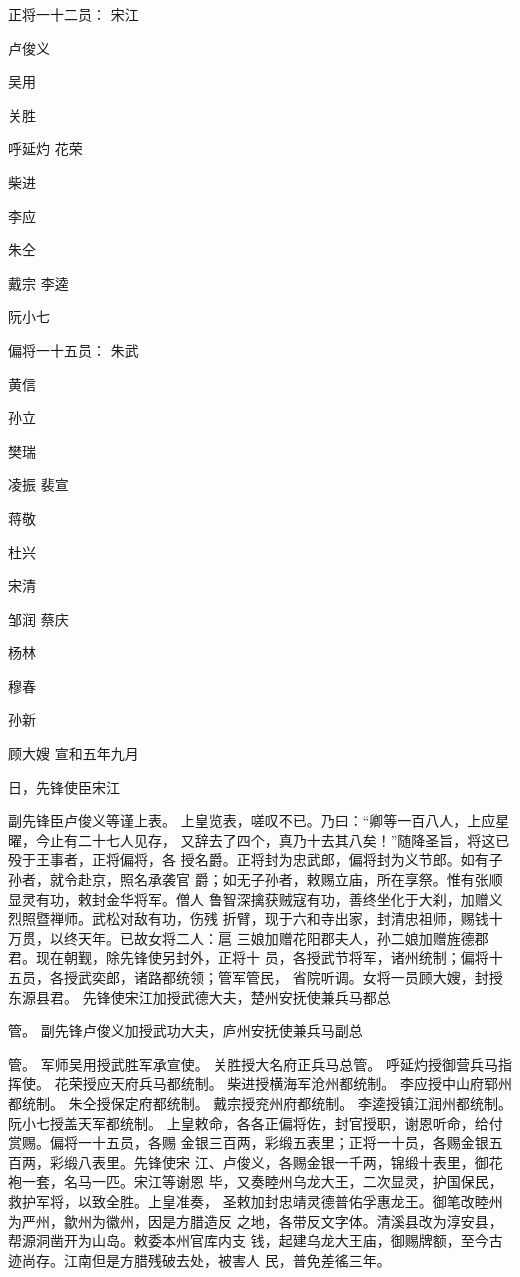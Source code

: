 正将一十二员：
宋江

卢俊义

吴用

关胜

呼延灼
花荣

柴进

李应

朱仝

戴宗
李逵

阮小七

偏将一十五员：
朱武

黄信

孙立

樊瑞

凌振
裴宣

蒋敬

杜兴

宋清

邹润
蔡庆

杨林

穆春

孙新

顾大嫂
宣和五年九月

日，先锋使臣宋江

副先锋臣卢俊义等谨上表。
上皇览表，嗟叹不已。乃曰：“卿等一百八人，上应星曜，今止有二十七人见存，
又辞去了四个，真乃十去其八矣！”随降圣旨，将这已殁于王事者，正将偏将，各
授名爵。正将封为忠武郎，偏将封为义节郎。如有子孙者，就令赴京，照名承袭官
爵；如无子孙者，敕赐立庙，所在享祭。惟有张顺显灵有功，敕封金华将军。僧人
鲁智深擒获贼寇有功，善终坐化于大刹，加赠义烈照暨禅师。武松对敌有功，伤残
折臂，现于六和寺出家，封清忠祖师，赐钱十万贯，以终天年。已故女将二人：扈
三娘加赠花阳郡夫人，孙二娘加赠旌德郡君。现在朝觐，除先锋使另封外，正将十
员，各授武节将军，诸州统制；偏将十五员，各授武奕郎，诸路都统领；管军管民，
省院听调。女将一员顾大嫂，封授东源县君。
先锋使宋江加授武德大夫，楚州安抚使兼兵马都总

管。
副先锋卢俊义加授武功大夫，庐州安抚使兼兵马副总

管。
军师吴用授武胜军承宣使。
关胜授大名府正兵马总管。
呼延灼授御营兵马指挥使。
花荣授应天府兵马都统制。
柴进授横海军沧州都统制。
李应授中山府郓州都统制。
朱仝授保定府都统制。
戴宗授兖州府都统制。
李逵授镇江润州都统制。
阮小七授盖天军都统制。
上皇敕命，各各正偏将佐，封官授职，谢恩听命，给付赏赐。偏将一十五员，各赐
金银三百两，彩缎五表里；正将一十员，各赐金银五百两，彩缎八表里。先锋使宋
江、卢俊义，各赐金银一千两，锦缎十表里，御花袍一套，名马一匹。宋江等谢恩
毕，又奏睦州乌龙大王，二次显灵，护国保民，救护军将，以致全胜。上皇准奏，
圣敕加封忠靖灵德普佑孚惠龙王。御笔改睦州为严州，歙州为徽州，因是方腊造反
之地，各带反文字体。清溪县改为淳安县，帮源洞凿开为山岛。敕委本州官库内支
钱，起建乌龙大王庙，御赐牌额，至今古迹尚存。江南但是方腊残破去处，被害人
民，普免差徭三年。

